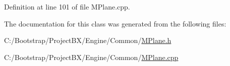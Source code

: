 Definition at line 101 of file MPlane.cpp.

The documentation for this class was generated from the following files:\begin{CompactItemize}
\item 
C:/Bootstrap/ProjectBX/Engine/Common/\hyperlink{_m_plane_8h}{MPlane.h}\item 
C:/Bootstrap/ProjectBX/Engine/Common/\hyperlink{_m_plane_8cpp}{MPlane.cpp}\end{CompactItemize}
